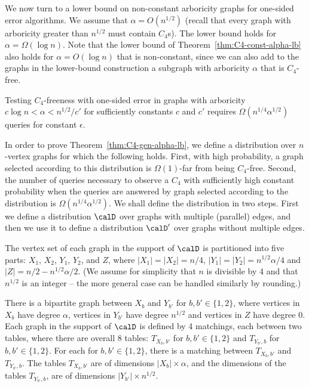\medskip
We now turn to a lower bound on non-constant arboricity graphs for one-sided error algorithms. We assume that $\alpha =O(n^{1/2})$ (recall that every graph with  arboricity greater than $n^{1/2}$ must contain $C_4$s).   The lower bound holds for $\alpha = \Omega(\log n)$. Note that the lower bound of Theorem~\ref{thm:C4-const-alpha-lb} also holds for $\alpha = O(\log n)$ that is non-constant, since we can also add to the graphs in the lower-bound construction a subgraph with arboricity $\alpha$ that is $C_4$-free. 

\begin{theorem}\label{thm:C4-gen-alpha-lb}
Testing $C_4$-freeness with one-sided error in graphs with arboricity $c\log n < \alpha < n^{1/2}/c'$ for sufficiently constants $c$ and $c'$ requires $\Omega(n^{1/4}\alpha^{1/2})$ queries for constant $\epsilon$.
\end{theorem}


In order to prove Theorem~\ref{thm:C4-gen-alpha-lb}, we define
a distribution %
over $n$-vertex graphs for which the following holds. First, with high probability, a graph selected according to %
this distribution is $\Omega(1)$-far from being $C_4$-free. Second, the number of queries necessary to observe a $C_4$ with sufficiently high constant probability when the queries are answered by graph selected according to 
the distribution %
is $\Omega(n^{1/4}\alpha^{1/2})$. 
We shall define the distribution in two steps. First we define a distribution $\calD$ over graphs with multiple (parallel) edges, and then we use it to define a distribution $\calD'$ over graphs without multiple edges. 


The vertex set of each graph in the support of $\calD$ is partitioned into five parts: $X_1$, $X_2$, $Y_1$, $Y_2$, and $Z$, where $|X_1| = |X_2|=n/4$, $|Y_1| = |Y_2| = n^{1/2}\alpha/4$ and $|Z| = n/2- n^{1/2}\alpha/2$. (We assume for simplicity that $n$ is divisible by 4 and that $n^{1/2}$ is an integer -- the more general case can be handled similarly by rounding.)

There is a bipartite graph between $X_b$ and $Y_{b'}$ for $b,b' \in \{1,2\}$, where vertices in $X_b$ have degree $\alpha$, vertices in $Y_{b'}$ have degree $n^{1/2}$ and vertices in $Z$ have degree $0$.  Each graph in the support of $\calD$ is defined by 4 matchings, each between two tables, where there are overall 8 tables: $T_{X_b,b'}$ for $b,b' \in \{1,2\}$ and $T_{Y_{b'},b}$ for $b,b' \in \{1,2\}$. For each for $b,b' \in \{1,2\}$, there is a matching between $T_{X_b,b'}$ and $T_{Y_{b'},b}$. The tables $T_{X_b,b'}$ are of dimensions $|X_b|\times \alpha$, and the dimensions of the tables $T_{Y_{b'},b}$, are of dimensions $|Y_{b'}|\times n^{1/2}$.

